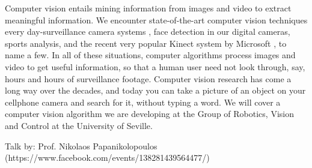 Computer vision entails mining information from images and video to extract meaningful information. We encounter state-of-the-art computer vision techniques every day-surveillance camera systems \cite{traffic_surveillance_pergamon} \cite{distributed_surveillance} \cite{vehicle_detection}, face detection in our digital cameras, sports analysis, and the recent very popular Kinect system by Microsoft \cite{Kinect_intro}, to name a few. In all of these situations, computer algorithms process images and video to get useful information, so that a human user need not look through, say, hours and hours of surveillance footage. Computer vision research has come a long way over the decades, and today you can take a picture of an object on your cellphone camera and search for it, without typing a word. We will cover a computer vision algorithm we are developing at the Group of Robotics, Vision and Control at the University of Seville.

Talk by: Prof. Nikolaos Papanikolopoulos (https://www.facebook.com/events/138281439564477/)

